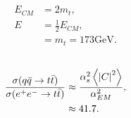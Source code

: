 \documentclass[
a4paper,
10pt,
twoside,
prd,
aps,
nofootinbib,
superscriptaddress,
floatfix,
preprintnumbers,
]{article}
\begin{document}
\subsection{}

\begin{align}
	E_{CM} &= 2m_t,\\
	E &= \frac{1}{2}E_{CM},\\
	&= m_t = 173\text{GeV}.
\end{align}

\subsection{}
\begin{align}
	\frac{\sigma(q\bar{q}\rightarrow t\bar{t})}{\sigma(e^+e^- \rightarrow t\bar{t})} &\approx \frac{\alpha_s^2 \ev{\abs{C}^2}}{\alpha_{EM}^2},\\
	&\approx 41.7.
\end{align}

\printbib


\stopmcols
\end{document}
